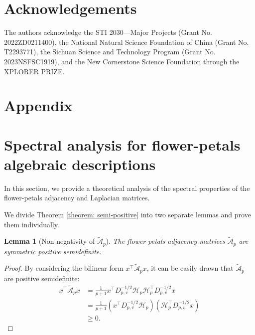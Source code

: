 \documentclass[letterpaper]{article} \usepackage{aaai24}
\theoremstyle{plain}
\newtheorem{lemma}[theorem]{Lemma}
\theoremstyle{definition}
\theoremstyle{remark}
\begin{document}
\section*{Acknowledgements}
The authors acknowledge the STI 2030—Major Projects (Grant No. 2022ZD0211400), the National Natural Science Foundation of China (Grant No. T2293771), the Sichuan Science and Technology Program (Grant No. 2023NSFSC1919), and the New Cornerstone Science Foundation through the XPLORER PRIZE.


\appendix



\clearpage
\section*{\centering \Large Appendix}

\section{Spectral analysis for flower-petals algebraic descriptions}
\label{appendix: spectral}
In this section, we provide a theoretical analysis of the spectral properties of the flower-petals adjacency and Laplacian matrices.


We divide Theorem \ref{theorem: semi-positive} into two separate lemmas and prove them individually.

\begin{lemma}[Non-negativity of $\tilde{\mathcal{A}}_p$]
\label{lemma: semi-positive_A}
The flower-petals adjacency matrices $\tilde{\mathcal{A}}_p$ are symmetric positive semidefinite.
\end{lemma}

\begin{proof}
By considering the bilinear form $x^\top \tilde{\mathcal{A}}_p x$, it can be easily drawn that $\tilde{\mathcal{A}}_p$ are positive semidefinite:
\begin{equation}
    \begin{split}
        x^\top \tilde{\mathcal{A}}_p x   
        & = \frac{1}{p+1} x^\top D_{p,v}^{-1/2} \mathcal{H}_p \mathcal{H}_p^\top D_{p,v}^{-1/2} x\\
        & = \frac{1}{p+1} \left(x^\top D_{p,v}^{-1/2} \mathcal{H}_p\right) \left(\mathcal{H}_p^\top D_{p,v}^{-1/2} x\right) \\
        & \geq 0.
    \end{split}
\end{equation}
\end{proof}
\end{document}
